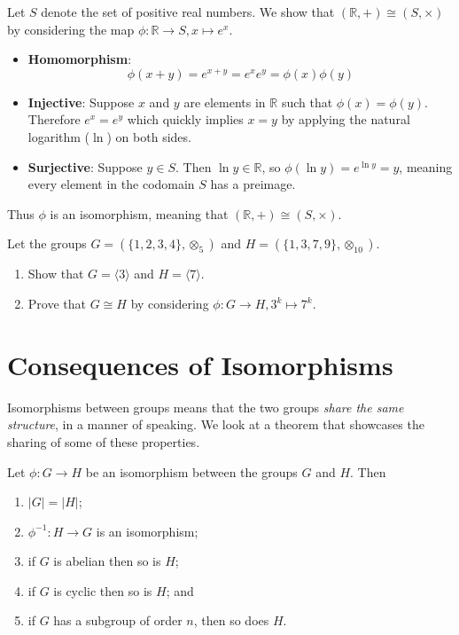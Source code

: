 \begin{example}
    Let $S$ denote the set of positive real numbers. We show that $(\mathbb{R}, +) \cong (S, \times)$ by considering the map $\phi: \mathbb{R} \to S, x \mapsto e^x$.
    \begin{itemize}
        \item \textbf{Homomorphism}:
        \[
            \phi(x+y) = e^{x+y} = e^xe^y = \phi(x)\phi(y)
        \]

        \item \textbf{Injective}: Suppose $x$ and $y$ are elements in $\mathbb{R}$ such that $\phi(x) = \phi(y)$. Therefore $e^x = e^y$ which quickly implies $x = y$ by applying the natural logarithm ($\ln$) on both sides.

        \item \textbf{Surjective}: Suppose $y \in S$. Then $\ln y \in \mathbb{R}$, so $\phi(\ln y) = e^{\ln y} = y$, meaning every element in the codomain $S$ has a preimage.
    \end{itemize}

    Thus $\phi$ is an isomorphism, meaning that $(\mathbb{R}, +) \cong (S, \times)$.
\end{example}

\begin{exercise}
    Let the groups $G = (\{1, 2, 3, 4\}, \otimes_5)$ and $H = (\{1, 3, 7, 9\}, \otimes_{10})$.
    \begin{enumerate}[label=(\roman*)]
        \item Show that $G = \langle 3 \rangle$ and $H = \langle 7 \rangle$.
        \item Prove that $G \cong H$ by considering $\phi: G \to H, 3^k \mapsto 7^k$.
    \end{enumerate}
\end{exercise}

\section{Consequences of Isomorphisms}
Isomorphisms between groups means that the two groups \textit{share the same structure}, in a manner of speaking. We look at a theorem that showcases the sharing of some of these properties.
\begin{theorem}\label{thrm-isomorphism-consequences}
    Let $\phi: G \to H$ be an isomorphism between the groups $G$ and $H$. Then
    \begin{enumerate}
        \item $|G| = |H|$;
        \item $\phi^{-1}: H \to G$ is an isomorphism;
        \item if $G$ is abelian then so is $H$;
        \item if $G$ is cyclic then so is $H$; and
        \item if $G$ has a subgroup of order $n$, then so does $H$.
    \end{enumerate}
\end{theorem}

